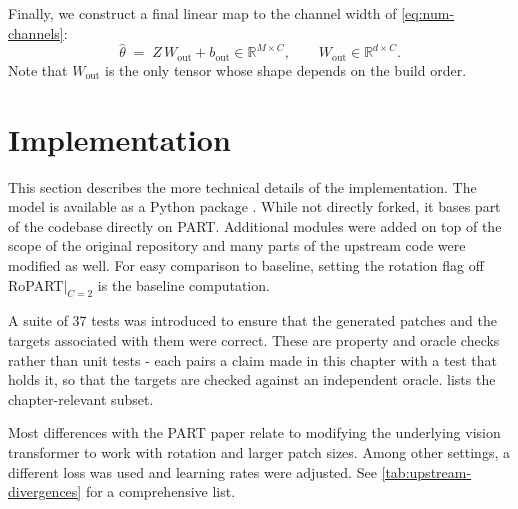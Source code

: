 \documentclass[final_report.tex]{subfiles}
\begin{document}
Finally, we construct a final linear map to the channel width of \cref{eq:num-channels}:
\begin{equation}\label{eq:head-out}
  \hat\theta \;=\; Z\,W_{\mathrm{out}} + b_{\mathrm{out}} \in \mathbb{R}^{M \times C},
  \qquad W_{\mathrm{out}} \in \mathbb{R}^{d \times C}.
\end{equation}
Note that $W_{\mathrm{out}}$ is the only tensor whose shape depends on the build order.


\section{Implementation}\label{sec:implementation}
This section describes the more technical details of the implementation. The model is available as a Python package . While not directly forked, it bases part of the codebase directly on PART. Additional modules were added on top of the scope of the original repository and many parts of the upstream code were modified as well. For easy comparison to baseline, setting the rotation flag off RoPART$|_{C=2}$ is the baseline computation. 

A suite of 37 tests was introduced to ensure that the generated patches and the targets associated with them were correct. These are property and oracle checks rather than unit tests - each pairs a claim made in this chapter with a test that holds it, so that the targets are checked against an independent oracle.  lists the chapter-relevant subset.

Most differences with the PART paper relate to modifying the underlying vision transformer to work with rotation and larger patch sizes. Among other settings, a different loss was used and learning rates were adjusted. See \cref{tab:upstream-divergences} for a comprehensive list.
\end{document}
